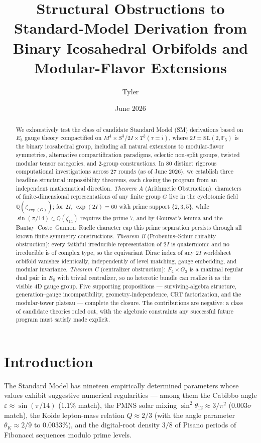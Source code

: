 \documentclass[11pt,a4paper]{amsart}
\title[Structural Obstructions to SM from 2I Orbifolds]{Structural Obstructions to Standard-Model Derivation from \\ Binary Icosahedral Orbifolds and Modular-Flavor Extensions}
\author{Tyler}
\date{June 2026}
\theoremstyle{definition}
\theoremstyle{remark}
\newcommand{\SL}{\mathrm{SL}}
\newcommand{\bbQ}{\mathbb{Q}}
\newcommand{\bbF}{\mathbb{F}}
\begin{document}
\begin{abstract}
We exhaustively test the class of candidate Standard Model (SM) derivations
based on $E_8$ gauge theory compactified on $M^4 \times S^3/2I \times T^2(\tau{=}i)$,
where $2I = \SL(2,\bbF_5)$ is the binary icosahedral group, including all
natural extensions to modular-flavor symmetries, alternative compactification
paradigms, eclectic non-split groups, twisted modular tensor categories, and
2-group constructions. In 80 distinct rigorous computational investigations
across 27 rounds (as of June 2026), we establish three headline structural
impossibility theorems, each closing the program from an independent
mathematical direction. \emph{Theorem A} (Arithmetic Obstruction): characters
of finite-dimensional representations of any finite group $G$ live in the
cyclotomic field $\bbQ(\zeta_{\exp(G)})$; for $2I$, $\exp(2I) = 60$ with prime
support $\{2,3,5\}$, while $\sin(\pi/14) \in \bbQ(\zeta_{14})$ requires the
prime $7$, and by Goursat's lemma and the Bantay--Coste--Gannon--Ruelle
character cap this prime separation persists through all known
finite-symmetry constructions. \emph{Theorem B} (Frobenius--Schur chirality
obstruction): every faithful irreducible representation of $2I$ is
quaternionic and no irreducible is of complex type, so the equivariant Dirac
index of any $2I$ worldsheet orbifold vanishes identically, independently of
level matching, gauge embedding, and modular invariance. \emph{Theorem C}
(centralizer obstruction): $F_4 \times G_2$ is a maximal regular dual pair in
$E_8$ with trivial centralizer, so no heterotic bundle can realize it as the
visible 4D gauge group. Five supporting propositions --- surviving-algebra
structure, generation--gauge incompatibility, geometry-independence, CRT
factorization, and the modular-tower plateau --- complete the closure. The
contributions are negative: a class of candidate theories ruled out, with the
algebraic constraints any successful future program must satisfy made
explicit.
\end{abstract}

\maketitle

\section{Introduction}

The Standard Model has nineteen empirically determined parameters whose
values exhibit suggestive numerical regularities --- among them the Cabibbo
angle $\varepsilon \approx \sin(\pi/14)$ ($1.1\%$ match), the PMNS solar mixing
$\sin^2 \theta_{12} \approx 3/\pi^2$ ($0.003\sigma$ match), the Koide
lepton-mass relation $Q \approx 2/3$ (with the angle parameter $\theta_K \approx 2/9$
to $0.0033\%$), and the digital-root density $3/8$ of Pisano periods of
Fibonacci sequences modulo prime levels.
\end{document}
